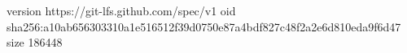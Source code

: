 version https://git-lfs.github.com/spec/v1
oid sha256:a10ab656303310a1e516512f39d0750e87a4bdf827c48f2a2e6d810eda9f6d47
size 186448
